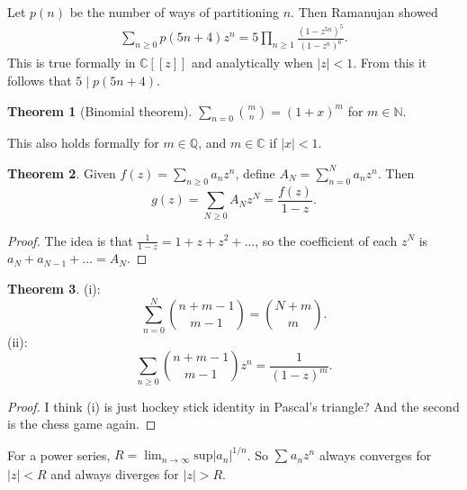 \documentclass{article}
\theoremstyle{definition}
\newtheorem{theorem}{Theorem}[section]
\theoremstyle{remark}
\begin{document}

Let $p(n)$ be the number of ways of partitioning $n$. Then Ramanujan showed
\begin{align*}
    \sum_{n\ge 0}^{} p(5n+4)z^n = 5 \prod_{n\ge 1}^{} \frac{(1-z^{5n})^5}{(1-z^n)^6}.
\end{align*}
This is true formally in $\mathbb{C}[[z]]$ and analytically when $|z|<1$. From this it follows that $5 \mid p(5n+4)$.

\begin{theorem}[Binomial theorem]
    $\sum_{n=0}^{} {{m} \choose {n}} = (1+x)^m$ for $m \in \mathbb{N}$.
\end{theorem}
This also holds formally for $m \in \mathbb{Q}$, and $m \in \mathbb{C}$ if $|x|<1$.
\vspace{1mm}
\begin{theorem}
    Given $f(z)=\sum_{n\ge 0}^{} a_n z^n$, define $A_N = \sum_{n=0}^{N} a_n z^n$. Then $$g(z) = \sum_{N\ge 0}^{} A_N z^N = \frac{f(z)}{1-z}.$$
\end{theorem}
\begin{proof}
    The idea is that $\frac{1}{1-z}=1+z+z^2+\ldots$, so the coefficient of each $z^N$ is $a_N + a_{N-1} + \ldots = A_N$.
\end{proof}
\begin{theorem}
    (i): \[
        \sum_{n=0}^{N} {{n+m-1} \choose {m-1}} = {{N+m} \choose {m}}.
        \]
    (ii): \[
    \sum_{n\ge 0}^{} {{n+m-1} \choose {m-1}} z^n = \frac{1}{(1-z)^m}.
    \]
\end{theorem}
\begin{proof}
    I think (i) is just hockey stick identity in Pascal's triangle? And the second is the chess game again.
\end{proof}
\vspace{1mm}

For a power series, $R =\lim_{n \to \infty} \text{sup} |a_n|^{1/n}$. So $\sum_{}^{} a_n z^n $ always converges for $|z|<R$ and always diverges for $|z|>R$.
\end{document}
